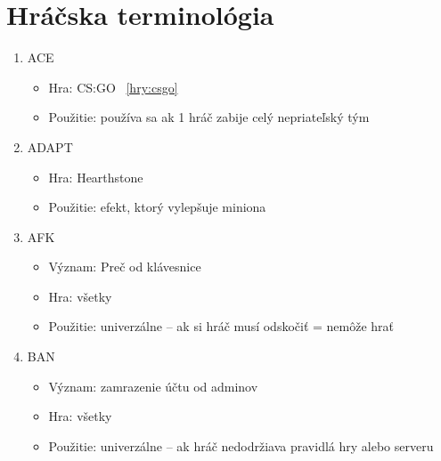 \documentclass[10pt,oneside,slovak,a4paper]{article}
\begin{document}


\section{Hráčska terminológia} \label{slovnik}


\begin{multicols}{2}

\end{multicols}


\begin{multicols}{2}
\begin{enumerate}

\item ACE
\begin{itemize}
 \item Hra: CS:GO ~\ref{hry:csgo}
 \item Použitie: používa sa ak 1 hráč zabije celý nepriateľský tým
\cite{a1}
\end{itemize}

\item ADAPT
\begin{itemize}
 \item Hra: Hearthstone
 \item Použitie: efekt, ktorý vylepšuje miniona
\cite{a1}
\end{itemize}

\item AFK
\begin{itemize}
 \item Význam: Preč od klávesnice
 \item Hra: všetky
 \item Použitie: univerzálne – ak si hráč musí odskočiť = nemôže hrať 
\cite{a1}
\end{itemize}

\item BAN
\begin{itemize}
 \item Význam: zamrazenie účtu od adminov
 \item Hra: všetky
 \item Použitie: univerzálne – ak hráč nedodržiava pravidlá hry alebo serveru
\cite{a1}
\end{itemize}


\end{enumerate}
\end{multicols}
\end{document}
